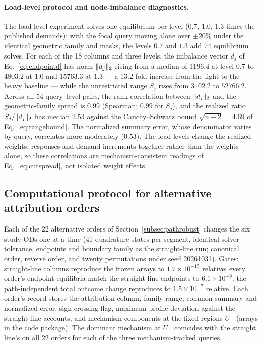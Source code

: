 \paragraph{Load-level protocol and node-imbalance diagnostics.}
The load-level experiment solves one equilibrium per level ($0.7$,
$1.0$, $1.3$ times the published demands); with the focal query moving
alone over $\pm20\%$ under the identical geometric family and masks,
the levels $0.7$ and $1.3$ add 74 equilibrium solves. For each of the
18 columns and three levels, the imbalance vector $d_j$ of
Eq.~\eqref{eq:endpointd} has norm $\lVert d_j \rVert_2$ rising from a median
of $1196.4$ at level $0.7$ to $4803.2$ at $1.0$ and $15763.3$ at
$1.3$ --- a $13.2$-fold increase from the light to the heavy baseline
--- while the unrestricted range $S_j$ rises from $3102.2$ to
$52766.2$. Across all 54 query--level pairs, the rank correlation
between $\lVert d_j \rVert_2$ and the geometric-family spread is $0.99$
(Spearman; $0.99$ for $S_j$), and the realized ratio
$S_j/\lVert d_j \rVert_2$ has median $2.53$ against the Cauchy--Schwarz bound
$\sqrt{n-2}=4.69$ of Eq.~\eqref{eq:rangebound}. The normalized
summary error, whose denominator varies by query, correlates more
moderately ($0.53$). The load levels change the realized weights,
responses and demand increments together rather than the weights alone,
so these correlations are mechanism-consistent readings of
Eq.~\eqref{eq:cutspread}, not isolated weight effects.

\subsection{Computational protocol for alternative attribution orders}\label{supp:pathrobust}
Each of the 22 alternative orders of Section~\ref{subsec:pathrobust}
changes the six study ODs one at a time (41 quadrature states per
segment, identical solver tolerance, endpoints and boundary family as
the straight-line run; canonical order, reverse order, and twenty
permutations under seed 20261031). Gates: straight-line columns
reproduce the frozen arrays to $1.7\times10^{-15}$ relative; every
order's endpoint equilibria match the straight-line endpoints to
$6.1\times10^{-9}$; the path-independent total outcome change
reproduces to $1.5\times10^{-7}$ relative. Each order's record stores
the attribution column, family range, common summary and normalized
error, sign-crossing flag, maximum profile deviation against the
straight-line accounts, and mechanism components at the fixed regions
$U_-$ (arrays in the code package). The dominant mechanism at $U_-$
coincides with the straight line's on all 22 orders for each of the
three mechanism-tracked queries.
